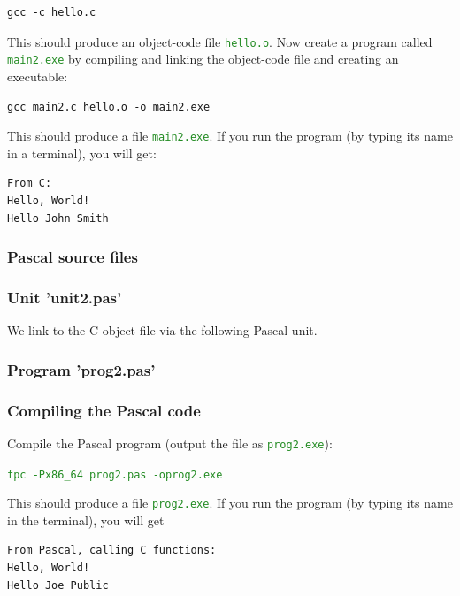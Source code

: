 \documentclass[10pt,a4paper]{article}
\newcommand{\mytext}[1]{\textcolor{ForestGreen}{\texttt{#1}}}
\begin{document}
\lstset{style=myBash}
\begin{lstlisting}
gcc -c hello.c
\end{lstlisting}

This should produce an object-code file \mytext{hello.o}. Now create a
program called \mytext{main2.exe} by compiling and linking the
object-code file and creating an executable:

\lstset{style=myBash}
\begin{lstlisting}
gcc main2.c hello.o -o main2.exe
\end{lstlisting}

This should produce a file \mytext{main2.exe}. If you run the program (by typing its name in a terminal), you will get:

\lstset{style=myBash}
\begin{lstlisting}
From C:
Hello, World!
Hello John Smith
\end{lstlisting}
\clearpage


\subsubsection{Pascal source files}
\lstset{style=myPascal}

\subsubsection*{Unit 'unit2.pas'}
We link to the C object file via the following Pascal unit.


\subsubsection*{Program 'prog2.pas'}


\newpage
\subsubsection*{Compiling the Pascal code}
Compile the Pascal program (output the file as \mytext{prog2.exe}):

\mytext{fpc -Px86\_64 prog2.pas -oprog2.exe}

This should produce a file \mytext{prog2.exe}. If you run the program (by typing its name in the terminal), you will get

\lstset{style=myBash}
\begin{lstlisting}
From Pascal, calling C functions:
Hello, World!
Hello Joe Public
\end{lstlisting}
\clearpage
\end{document}
